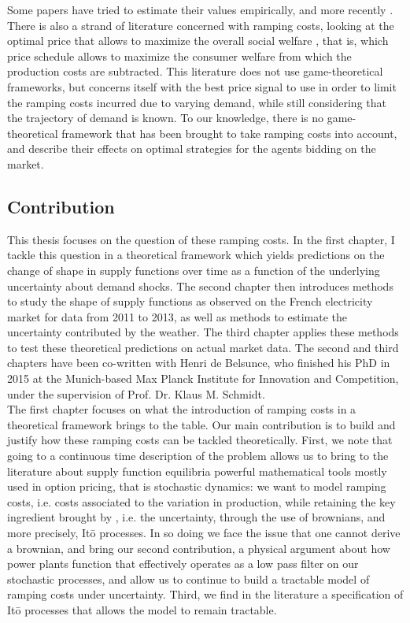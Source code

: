 Some papers have tried to estimate their values empirically, \cite{wolak2007quantifying} and more recently \cite{reguant2011welfare}. There is also a strand of literature concerned with ramping costs, looking at the optimal price that allows to maximize the overall social welfare \cite{tanaka2006real}, that is, which price schedule allows to maximize the consumer welfare from which the production costs are subtracted. This literature does not use game-theoretical frameworks, but concerns itself with the best price signal to use in order to limit the ramping costs incurred due to varying demand, while still considering that the trajectory of demand is known. To our knowledge, there is no game-theoretical framework that has been brought to take ramping costs into account, and describe their effects on optimal strategies for the agents bidding on the market. 

\subsection*{Contribution}

This thesis focuses on the question of these ramping costs. In the first chapter, I tackle this question in a theoretical framework which yields predictions on the change of shape in supply functions over time as a function of the underlying uncertainty about demand shocks. The second chapter then introduces methods to study the shape of supply functions as observed on the French electricity market for data from 2011 to 2013, as well as methods to estimate the uncertainty contributed by the weather. The third chapter applies these methods to test these theoretical predictions on actual market data. The second and third chapters have been co-written with Henri de Belsunce, who finished his PhD in 2015 at the Munich-based Max Planck Institute for Innovation and Competition, under the supervision of Prof. Dr. Klaus M. Schmidt.\\

The first chapter focuses on what the introduction of ramping costs in a theoretical framework brings to the table. Our main contribution is to build and justify how these ramping costs can be tackled theoretically. First, we note that going to a continuous time description of the problem allows us to bring to the literature about supply function equilibria powerful mathematical tools mostly used in option pricing, that is stochastic dynamics: we want to model ramping costs, i.e. costs associated to the variation in production, while retaining the key ingredient brought by \cite{KM}, i.e. the uncertainty, through the use of brownians, and more precisely, It\={o} processes. In so doing we face the issue that one cannot derive a brownian, and bring our second contribution, a physical argument about how power plants function that effectively operates as a low pass filter on our stochastic processes, and allow us to continue to build a tractable model of ramping costs under uncertainty. Third, we find in the literature a specification of It\={o} processes that allows the model to remain tractable. \\

